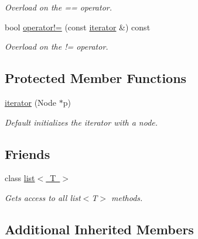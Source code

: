 \begin{DoxyCompactItemize}
\begin{DoxyCompactList}\small\item\em Overload on the == operator. \end{DoxyCompactList}\item 
\mbox{\label{classsc_1_1list_1_1iterator_a029b713787de6e1402aae2079bba9f95}} 
bool \mbox{\hyperlink{classsc_1_1list_1_1iterator_a029b713787de6e1402aae2079bba9f95}{operator!=}} (const \mbox{\hyperlink{classsc_1_1list_1_1iterator}{iterator}} \&) const
\begin{DoxyCompactList}\small\item\em Overload on the != operator. \end{DoxyCompactList}\end{DoxyCompactItemize}
\subsection*{Protected Member Functions}
\begin{DoxyCompactItemize}
\item 
\mbox{\label{classsc_1_1list_1_1iterator_a818795d7651516a93e563f3229e86351}} 
\mbox{\hyperlink{classsc_1_1list_1_1iterator_a818795d7651516a93e563f3229e86351}{iterator}} (Node $\ast$p)
\begin{DoxyCompactList}\small\item\em Default initializes the iterator with a node. \end{DoxyCompactList}\end{DoxyCompactItemize}
\subsection*{Friends}
\begin{DoxyCompactItemize}
\item 
\mbox{\label{classsc_1_1list_1_1iterator_ab6cf03d50c50087700b0fb872accfa7b}} 
class \mbox{\hyperlink{classsc_1_1list_1_1iterator_ab6cf03d50c50087700b0fb872accfa7b}{list$<$ T $>$}}
\begin{DoxyCompactList}\small\item\em Get\textquotesingle{}s access to all list$<$\+T$>$ methods. \end{DoxyCompactList}\end{DoxyCompactItemize}
\subsection*{Additional Inherited Members}


